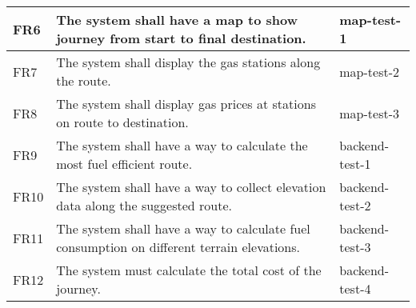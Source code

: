 \documentclass[12pt, titlepage]{article}
\begin{document}
\begin{table}[!hbp]
\begin{tabular}{|p{3.5cm}|p{6.5cm}|p{4.5cm}|}
	FR6                     & The system shall have a map to show journey from start to final destination.                                                                                                                                  & map-test-1                                                                                          \\ \hline
	FR7                     & The system shall display the gas stations along the route.                                                                                                         & map-test-2                                                                                          \\ \hline
	FR8                    & The system shall display gas prices at stations on route to destination.                                                                                                         & map-test-3                                                                                          \\ \hline
	FR9                     & The system shall have a way to calculate the most fuel efficient route.                                                                                                         & backend-test-1                                                                                          \\ \hline
	FR10                    & The system shall have a way to collect elevation data along the suggested route.                                                                                                         & backend-test-2                                                                                          \\ \hline
	FR11                    & The system shall have a way to calculate fuel consumption on different terrain elevations.                                                                                                         & backend-test-3                                                                                          \\ \hline
	FR12                     & The system must calculate the total cost of the journey.                                                                                                         & backend-test-4                                                                                          \\ \hline
	
	\end{tabular}
	
  \end{table}
\end{document}
